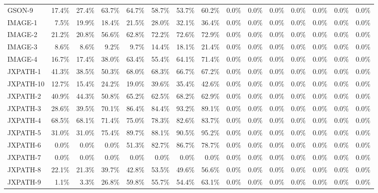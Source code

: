 \begin{tabular}{ l rrrrrrr rrrrrrr}
GSON-9 &  17.4\% &  27.4\% &  63.7\% &  64.7\% &  58.7\% &  53.7\% &  60.2\% &  0.0\% &  0.0\% &  0.0\% &  0.0\% &  0.0\% &  0.0\% &  0.0\%\\ 
IMAGE-1 &  7.5\% &  19.9\% &  18.4\% &  21.5\% &  28.0\% &  32.1\% &  36.4\% &  0.0\% &  0.0\% &  0.0\% &  0.0\% &  0.0\% &  0.0\% &  0.0\%\\ 
IMAGE-2 &  21.2\% &  20.8\% &  56.6\% &  62.8\% &  72.2\% &  72.6\% &  72.9\% &  0.0\% &  0.0\% &  0.0\% &  0.0\% &  0.0\% &  0.0\% &  0.0\%\\ 
IMAGE-3 &  8.6\% &  8.6\% &  9.2\% &  9.7\% &  14.4\% &  18.1\% &  21.4\% &  0.0\% &  0.0\% &  0.0\% &  0.0\% &  0.0\% &  0.0\% &  0.0\%\\ 
IMAGE-4 &  16.7\% &  17.4\% &  38.0\% &  63.4\% &  55.4\% &  64.1\% &  71.4\% &  0.0\% &  0.0\% &  0.0\% &  0.0\% &  0.0\% &  0.0\% &  0.0\%\\ 
JXPATH-1 &  41.3\% &  38.5\% &  50.3\% &  68.0\% &  68.3\% &  66.7\% &  67.2\% &  0.0\% &  0.0\% &  0.0\% &  0.0\% &  0.0\% &  0.0\% &  0.0\%\\ 
JXPATH-10 &  12.7\% &  15.4\% &  24.2\% &  19.0\% &  39.6\% &  35.4\% &  42.6\% &  0.0\% &  0.0\% &  0.0\% &  0.0\% &  0.0\% &  0.0\% &  0.0\%\\ 
JXPATH-2 &  40.9\% &  44.3\% &  50.8\% &  65.2\% &  62.5\% &  68.2\% &  62.9\% &  0.0\% &  0.0\% &  0.0\% &  0.0\% &  0.0\% &  0.0\% &  0.0\%\\ 
JXPATH-3 &  28.6\% &  39.5\% &  70.1\% &  86.4\% &  84.4\% &  93.2\% &  89.1\% &  0.0\% &  0.0\% &  0.0\% &  0.0\% &  0.0\% &  0.0\% &  0.0\%\\ 
JXPATH-4 &  68.5\% &  68.1\% &  71.4\% &  75.0\% &  78.3\% &  82.6\% &  83.7\% &  0.0\% &  0.0\% &  0.0\% &  0.0\% &  0.0\% &  0.0\% &  0.0\%\\ 
JXPATH-5 &  31.0\% &  31.0\% &  75.4\% &  89.7\% &  88.1\% &  90.5\% &  95.2\% &  0.0\% &  0.0\% &  0.0\% &  0.0\% &  0.0\% &  0.0\% &  0.0\%\\ 
JXPATH-6 &  0.0\% &  0.0\% &  0.0\% &  51.3\% &  82.7\% &  86.7\% &  78.7\% &  0.0\% &  0.0\% &  0.0\% &  0.0\% &  0.0\% &  0.0\% &  0.0\%\\ 
JXPATH-7 &  0.0\% &  0.0\% &  0.0\% &  0.0\% &  0.0\% &  0.0\% &  0.0\% &  0.0\% &  0.0\% &  0.0\% &  0.0\% &  0.0\% &  0.0\% &  0.0\%\\ 
JXPATH-8 &  22.1\% &  21.3\% &  39.7\% &  42.8\% &  53.5\% &  49.6\% &  56.6\% &  0.0\% &  0.0\% &  0.0\% &  0.0\% &  0.0\% &  0.0\% &  0.0\%\\ 
JXPATH-9 &  1.1\% &  3.3\% &  26.8\% &  59.8\% &  55.7\% &  54.4\% &  63.1\% &  0.0\% &  0.0\% &  0.0\% &  0.0\% &  0.0\% &  0.0\% &  0.0\%\\ 

\end{tabular}
